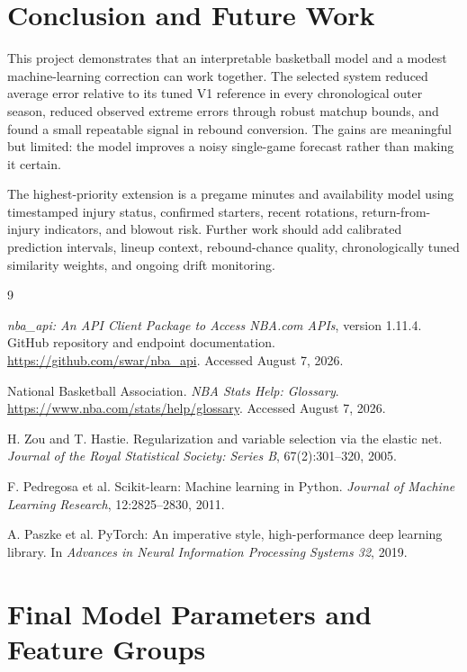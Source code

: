 \documentclass[11pt]{article}
\begin{document}
\section{Conclusion and Future Work}

This project demonstrates that an interpretable basketball model and a modest
machine-learning correction can work together. The selected system reduced
average error relative to its tuned V1 reference in every chronological outer
season, reduced observed extreme errors through robust matchup bounds, and found
a small repeatable signal in rebound conversion. The gains are meaningful but
limited: the model improves a noisy single-game forecast rather than making it
certain.

The highest-priority extension is a pregame minutes and availability
model using timestamped injury status, confirmed starters, recent rotations,
return-from-injury indicators, and blowout risk. Further work should add
calibrated prediction intervals, lineup context, rebound-chance quality,
chronologically tuned similarity weights, and ongoing drift monitoring.

\begin{thebibliography}{9}

\textit{nba\_api: An API Client Package to Access NBA.com APIs},
version 1.11.4.
GitHub repository and endpoint documentation.
\url{https://github.com/swar/nba_api}.
Accessed August 7, 2026.

National Basketball Association.
\textit{NBA Stats Help: Glossary}.
\url{https://www.nba.com/stats/help/glossary}.
Accessed August 7, 2026.

H. Zou and T. Hastie.
Regularization and variable selection via the elastic net.
\textit{Journal of the Royal Statistical Society: Series B},
67(2):301--320, 2005.

F. Pedregosa et al.
Scikit-learn: Machine learning in Python.
\textit{Journal of Machine Learning Research}, 12:2825--2830, 2011.

A. Paszke et al.
PyTorch: An imperative style, high-performance deep learning library.
In \textit{Advances in Neural Information Processing Systems 32}, 2019.

\end{thebibliography}

\appendix
\section{Final Model Parameters and Feature Groups}
\label{app:parameters}
\end{document}
